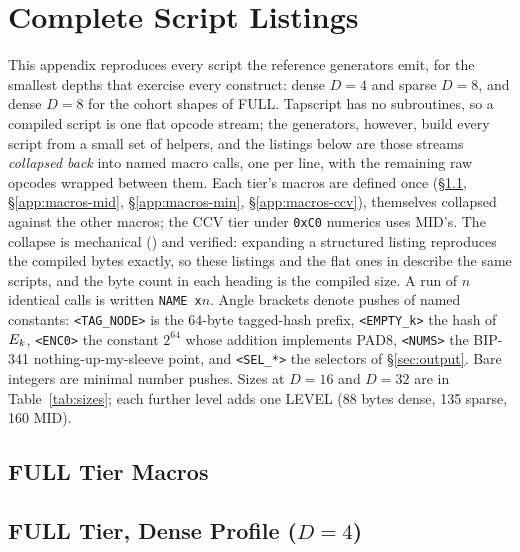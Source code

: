 \section{Complete Script Listings}\label{app:listings}

This appendix reproduces every script the reference generators emit, for
the smallest depths that exercise every construct: dense $D = 4$ and
sparse $D = 8$, and dense $D = 8$ for the cohort shapes of FULL. Tapscript has no subroutines, so a compiled script is one
flat opcode stream; the generators, however, build every script from a
small set of helpers, and the listings below are those streams
\emph{collapsed back} into named macro calls, one per line, with the
remaining raw opcodes wrapped between them. Each tier's macros are defined
once (\S\ref{app:macros-full}, \S\ref{app:macros-mid},
\S\ref{app:macros-min}, \S\ref{app:macros-ccv}), themselves collapsed
against the other macros; the CCV tier under \texttt{0xC0} numerics uses
MID's. The collapse is mechanical
() and verified: expanding a structured
listing reproduces the compiled bytes exactly, so these listings and the
flat ones in  describe the same scripts, and the byte
count in each heading is the compiled size. A run of $n$ identical calls
is written \texttt{NAME x$n$}. Angle brackets denote pushes of named
constants: \texttt{<TAG\_NODE>} is the 64-byte tagged-hash prefix,
\texttt{<EMPTY\_k>} the hash of $E_k$, \texttt{<ENC0>} the constant
$2^{64}$ whose addition implements \textsf{PAD8}, \texttt{<NUMS>} the
BIP-341 nothing-up-my-sleeve point, and \texttt{<SEL\_*>} the 
selectors of \S\ref{sec:output}. Bare integers are minimal number pushes.
Sizes at $D = 16$ and $D = 32$ are in Table~\ref{tab:sizes}; each further
level adds one \textsf{LEVEL} (88 bytes dense, 135 sparse, 160 MID).

\lstset{basicstyle=\ttfamily\scriptsize, breaklines=true, breakatwhitespace=true,
  columns=fullflexible, keepspaces=true, xleftmargin=0pt, aboveskip=2pt, belowskip=8pt}
\newcommand{\listingfile}[1]{}

\subsection{FULL Tier Macros}\label{app:macros-full}
\listingfile{MACROS_FULL.txt}

\subsection{FULL Tier, Dense Profile ($D = 4$)}
\listingfile{EXIT_1_D4.txt}
\listingfile{EXIT_2_D4.txt}
\listingfile{JOIN_0_D4.txt}
\listingfile{JOIN_2_D4.txt}
\listingfile{JOINK_2_D4.txt}
\listingfile{UPDATE_D4.txt}
\listingfile{UPDATE_X_D4.txt}
\listingfile{CLAIM_D4.txt}
\listingfile{CLAIM_H_D4.txt}
\listingfile{CLAIM_X_D4.txt}
\listingfile{SPLIT_D4.txt}

